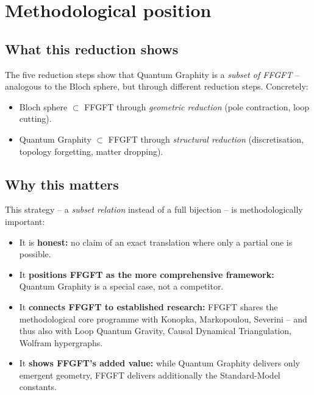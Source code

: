 \section{Methodological position}

\subsection{What this reduction shows}

The five reduction steps show that Quantum Graphity is a
\emph{subset of FFGFT} -- analogous to the Bloch sphere, but
through different reduction steps. Concretely:
\begin{itemize}[leftmargin=2em,itemsep=2pt,topsep=2pt]
  \item Bloch sphere $\subset$ FFGFT through \emph{geometric
        reduction} (pole contraction, loop cutting).
  \item Quantum Graphity $\subset$ FFGFT through \emph{structural
        reduction} (discretisation, topology forgetting, matter
        dropping).
\end{itemize}

\subsection{Why this matters}

This strategy -- a \emph{subset relation} instead of a full
bijection -- is methodologically important:

\begin{itemize}[leftmargin=2em,itemsep=2pt,topsep=2pt]
  \item It is \textbf{honest:} no claim of an exact translation
        where only a partial one is possible.
  \item It \textbf{positions FFGFT as the more comprehensive
        framework:} Quantum Graphity is a special case, not a
        competitor.
  \item It \textbf{connects FFGFT to established research:} FFGFT
        shares the methodological core programme with Konopka,
        Markopoulou, Severini -- and thus also with Loop Quantum
        Gravity, Causal Dynamical Triangulation, Wolfram
        hypergraphs.
  \item It \textbf{shows FFGFT's added value:} while Quantum
        Graphity delivers only emergent geometry, FFGFT delivers
        additionally the Standard-Model constants.
\end{itemize}


